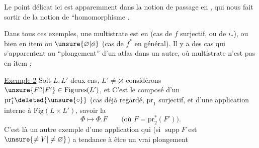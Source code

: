 Le point délicat ici\unsure{,|;} est apparemment dans la notion de passage en ,  qui nous fait sortir de la notion de ``homomorphisme .

Dans tous ces exemples, une multistrate est  en  (cas de  $f$ surjectif, ou de $i_*$), ou bien en item ou $\unsure{\varnothing|\phi}$ (cas de $f^*$ en général). Il y a des cas qui s'apparentent au ``plongement'' d'un atlas dans un autre, où multistrate n'est  pas  en item :

\uline{Exemple 2} Soit $L,L'$ deux ens, $L'\ne\varnothing$ considérons $\unsure{F''|F'}\in\mathrm{Figures}(L')$,  et
C'est le composé d'un $\mathrm{pr}_1^*\deleted{\unsure{\circ}}$ (cas déjà regardé, $\mathrm{pr}_1$ surjectif, et d'une application interne à $\mathrm{Fig}(L\times L')$, savoir la
\[
\Phi\longmapsto\Phi.F\qquad\text{(où }F=\mathrm{pr}_2^*(F')\text{)}.
\]
C'est là un autre exemple d'une application qui (si $\operatorname{supp}F$ est $\unsure{\ne V|\ne\varnothing}$) a tendance à être un vrai plongement 
